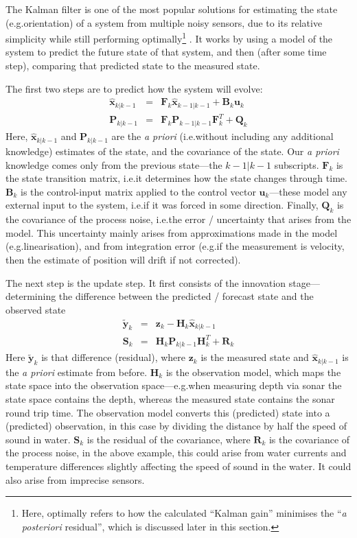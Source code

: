 \documentclass[12pt]{article}
\begin{document}
The Kalman filter \cite{kalman_1960} is one of the most popular solutions for estimating the state (e.g.\@ orientation) of a system from multiple noisy sensors, due to its relative simplicity while still performing optimally\footnote{Here, optimally refers to how the calculated ``Kalman gain'' minimises the ``\emph{a posteriori} residual'', which is discussed later in this section.} \cite{wangyan_2015}. It works by using a model of the system to predict the future state of that system, and then (after some time step), comparing that predicted state to the measured state.

The first two steps are to predict how the system will evolve:
\begin{eqnarray}
	\mathbf{\hat{x}}_{k | k-1} &=& \mathbf{F}_k \mathbf{\hat{x}}_{k-1|k-1} + \mathbf{B}_k \mathbf{u}_k \\
	\mathbf{P}_{k|k-1} &=& \mathbf{F}_k \mathbf{P}_{k-1 | k-1} \mathbf{F}^T_k + \mathbf{Q}_k
\end{eqnarray}
Here, $\mathbf{\hat{x}}_{k | k-1}$ and $\mathbf{P}_{k|k-1}$ are the \emph{a priori} (i.e.\@ without including any additional knowledge) estimates of the state, and the covariance of the state. Our \emph{a priori} knowledge comes only from the previous state---the $k-1|k-1$ subscripts. $\mathbf{F}_k$ is the state transition matrix, i.e.\@ it determines how the state changes through time. $\mathbf{B}_k$ is the control-input matrix applied to the control vector $\mathbf{u}_k$---these model any external input to the system, i.e.\@ if it was forced in some direction. Finally, $\mathbf{Q}_k$ is the covariance of the process noise, i.e.\@ the error / uncertainty that arises from the model. This uncertainty mainly arises from approximations made in the model (e.g.\@ linearisation), and from integration error (e.g.\@ if the measurement is velocity, then the estimate of position will drift if not corrected).

The next step is the update step. It first consists of the innovation stage---determining the difference between the predicted / forecast state and the observed state
\begin{eqnarray}
	\mathbf{\tilde{y}}_k &=& \mathbf{z}_k - \mathbf{H}_k \mathbf{\hat{x}}_{k|k-1} \\
	\mathbf{S}_k &=& \mathbf{H}_k \mathbf{P}_{k|k-1} \mathbf{H}^T_k + \mathbf{R}_k
\end{eqnarray}
Here $\mathbf{\tilde{y}}_k$ is that difference (residual), where $\mathbf{z}_k$ is the measured state and $\mathbf{\hat{x}}_{k|k-1}$ is the \emph{a priori} estimate from before. $\mathbf{H}_k$ is the observation model, which maps the state space into the observation space---e.g.\@ when measuring depth via sonar the state space contains the depth, whereas the measured state contains the sonar round trip time. The observation model converts this (predicted) state into a (predicted) observation, in this case by dividing the distance by half the speed of sound in water. $\mathbf{S}_k$ is the residual of the covariance, where $\mathbf{R}_k$ is the covariance of the process noise, in the above example, this could arise from water currents and temperature differences slightly affecting the speed of sound in the water. It could also arise from imprecise sensors.
\end{document}
